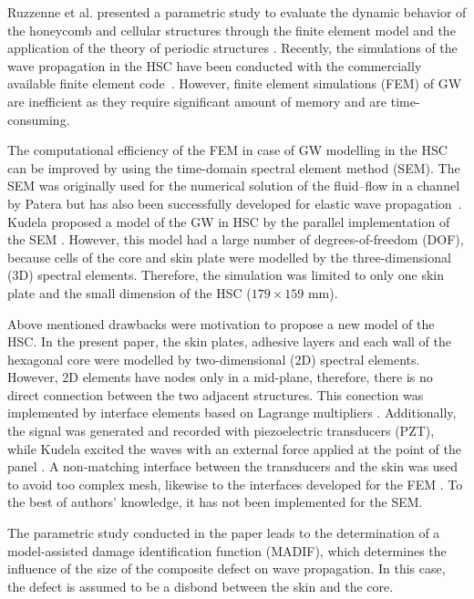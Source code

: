 \documentclass[materials,article,submit,moreauthors,pdftex]{Definitions/mdpi}
\begin{document}
Ruzzenne et al. presented a parametric study to evaluate the dynamic behavior of the honeycomb and cellular structures through the finite element model and the application of the theory of periodic structures \cite{ruzzene2003wave}.
Recently, the simulations of the wave propagation in the HSC have been conducted with the commercially available finite element code~\cite{song2009guided, hosseini2013numerical, tian2015wavenumber, zhao2018wave}.
However, finite element simulations (FEM) of GW are inefficient as they require significant amount of memory and are time-consuming.

The computational efficiency of the FEM in case of GW modelling in the HSC can be improved by using the time-domain spectral element method (SEM).
The SEM was originally used for the numerical solution of the fluid--flow in a channel by Patera \cite{patera1984spectral} but has also been successfully developed for elastic wave propagation~\cite{ostachowicz2011guided}.
Kudela proposed a model of the GW in HSC by the parallel implementation of the SEM \cite{kudela2016parallel}.
However, this model had a large number of degrees-of-freedom (DOF), because cells of the core and skin plate were modelled by the three-dimensional (3D) spectral elements.
Therefore, the simulation was limited to only one skin plate and the small dimension of the HSC (\(179 \times 159 \) mm).

Above mentioned drawbacks were motivation to propose a new model of the HSC. In the present paper, the skin plates, adhesive layers and each wall of the hexagonal core were modelled by two-dimensional (2D) spectral elements.
However, 2D elements have nodes only in a mid-plane, therefore, there is no direct connection between the two adjacent structures.
This conection was implemented by interface elements based on Lagrange multipliers \cite{ashwin2014formulation, fiborek20192d}.
Additionally, the signal was generated and recorded with piezoelectric transducers (PZT), while Kudela excited the waves with an external force applied at the point of the panel \cite{kudela2016parallel}.
A non-matching interface between the transducers and the skin was used to avoid too complex mesh, likewise to the interfaces developed for the FEM \cite{flemisch2000elasto, flemisch2012non}. To the best of authors’
knowledge, it has not been implemented for the SEM.

The parametric study conducted in the paper leads to the determination of a model-assisted damage identification function (MADIF), which determines the influence of the size of the composite defect on wave propagation.
In this case, the defect is assumed to be a disbond between the skin and the core.
\end{document}
